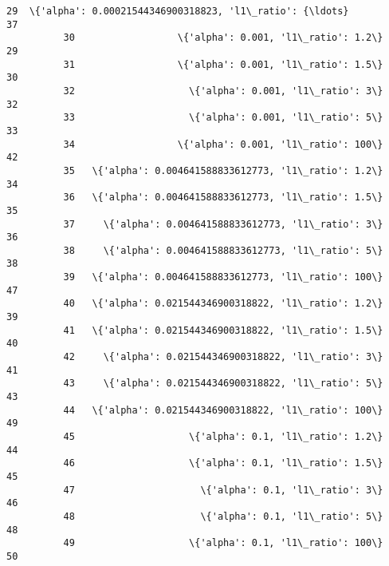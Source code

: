 \documentclass[11pt]{article}
\begin{document}
\begin{Verbatim}[commandchars=\\\{\}]
          29  \{'alpha': 0.00021544346900318823, 'l1\_ratio': {\ldots}               37   
          30                  \{'alpha': 0.001, 'l1\_ratio': 1.2\}               29   
          31                  \{'alpha': 0.001, 'l1\_ratio': 1.5\}               30   
          32                    \{'alpha': 0.001, 'l1\_ratio': 3\}               32   
          33                    \{'alpha': 0.001, 'l1\_ratio': 5\}               33   
          34                  \{'alpha': 0.001, 'l1\_ratio': 100\}               42   
          35   \{'alpha': 0.004641588833612773, 'l1\_ratio': 1.2\}               34   
          36   \{'alpha': 0.004641588833612773, 'l1\_ratio': 1.5\}               35   
          37     \{'alpha': 0.004641588833612773, 'l1\_ratio': 3\}               36   
          38     \{'alpha': 0.004641588833612773, 'l1\_ratio': 5\}               38   
          39   \{'alpha': 0.004641588833612773, 'l1\_ratio': 100\}               47   
          40   \{'alpha': 0.021544346900318822, 'l1\_ratio': 1.2\}               39   
          41   \{'alpha': 0.021544346900318822, 'l1\_ratio': 1.5\}               40   
          42     \{'alpha': 0.021544346900318822, 'l1\_ratio': 3\}               41   
          43     \{'alpha': 0.021544346900318822, 'l1\_ratio': 5\}               43   
          44   \{'alpha': 0.021544346900318822, 'l1\_ratio': 100\}               49   
          45                    \{'alpha': 0.1, 'l1\_ratio': 1.2\}               44   
          46                    \{'alpha': 0.1, 'l1\_ratio': 1.5\}               45   
          47                      \{'alpha': 0.1, 'l1\_ratio': 3\}               46   
          48                      \{'alpha': 0.1, 'l1\_ratio': 5\}               48   
          49                    \{'alpha': 0.1, 'l1\_ratio': 100\}               50   
          

\end{Verbatim}
\end{document}
